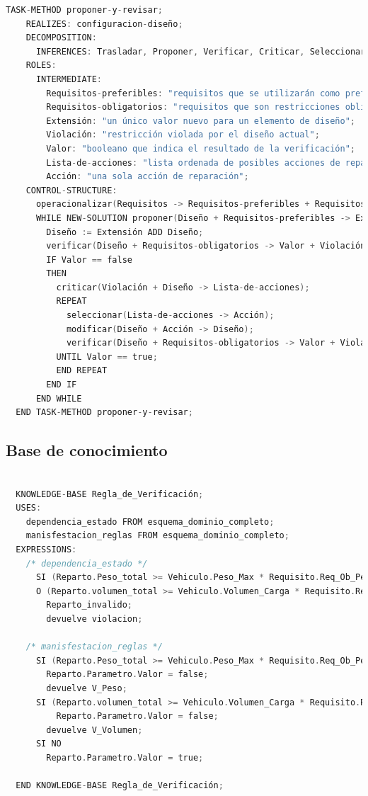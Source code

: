 \begin{lstlisting}[language=C,caption=\textbf{Método de la tarea}]
  TASK-METHOD proponer-y-revisar;
    REALIZES: configuracion-diseño;
    DECOMPOSITION:
      INFERENCES: Trasladar, Proponer, Verificar, Criticar, Seleccionar, Modificar;
    ROLES:
      INTERMEDIATE:
        Requisitos-preferibles: "requisitos que se utilizarán como preferencias (suaves)";
        Requisitos-obligatorios: "requisitos que son restricciones obligatorias (estrictas)";
        Extensión: "un único valor nuevo para un elemento de diseño";
        Violación: "restricción violada por el diseño actual";
        Valor: "booleano que indica el resultado de la verificación";
        Lista-de-acciones: "lista ordenada de posibles acciones de reparación (fijación)";
        Acción: "una sola acción de reparación";
    CONTROL-STRUCTURE:
      operacionalizar(Requisitos -> Requisitos-preferibles + Requisitos-obligatorios);
      WHILE NEW-SOLUTION proponer(Diseño + Requisitos-preferibles -> Extensión) DO
        Diseño := Extensión ADD Diseño;
        verificar(Diseño + Requisitos-obligatorios -> Valor + Violación);
        IF Valor == false
        THEN
          criticar(Violación + Diseño -> Lista-de-acciones);
          REPEAT
            seleccionar(Lista-de-acciones -> Acción);
            modificar(Diseño + Acción -> Diseño);
            verificar(Diseño + Requisitos-obligatorios -> Valor + Violación);
          UNTIL Valor == true;
          END REPEAT
        END IF
      END WHILE
  END TASK-METHOD proponer-y-revisar;
\end{lstlisting}

\subsection{Base de conocimiento}


\begin{lstlisting}[language=C,caption=\textbf{Regla\_de\_verificación}]

  KNOWLEDGE-BASE Regla_de_Verificación;
  USES:
    dependencia_estado FROM esquema_dominio_completo; 
    manisfestacion_reglas FROM esquema_dominio_completo;
  EXPRESSIONS:
    /* dependencia_estado */
      SI (Reparto.Peso_total >= Vehiculo.Peso_Max * Requisito.Req_Ob_Peso.Peso_value/100) 
      O (Reparto.volumen_total >= Vehiculo.Volumen_Carga * Requisito.Req_Ob_Volumen.Volumen_value/100) CAUSA 
        Reparto_invalido;
        devuelve violacion;
    
    /* manisfestacion_reglas */
      SI (Reparto.Peso_total >= Vehiculo.Peso_Max * Requisito.Req_Ob_Peso.Peso_value/100) TIENE-MANIFESTACION
        Reparto.Parametro.Valor = false;
        devuelve V_Peso;
      SI (Reparto.volumen_total >= Vehiculo.Volumen_Carga * Requisito.Req_Ob_Volumen.Volumen_value/100) TIENE-MANIFESTACION
          Reparto.Parametro.Valor = false;
        devuelve V_Volumen;
      SI NO 
        Reparto.Parametro.Valor = true;
   
  END KNOWLEDGE-BASE Regla_de_Verificación;
\end{lstlisting}

